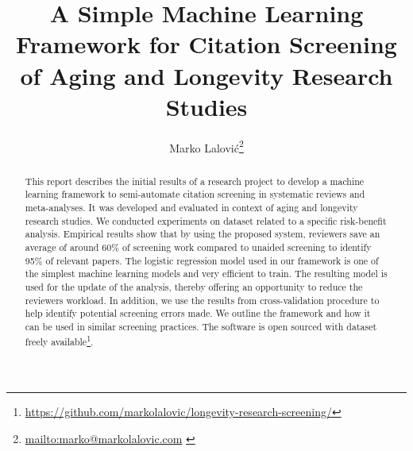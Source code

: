 \documentclass[10pt,twocolumn,letterpaper]{article}
\title{A Simple Machine Learning Framework for Citation Screening of Aging and Longevity Research Studies}
\author{%
	Marko Lalović\thanks{\footnotesize{%
	\url{mailto:marko@markolalovic.com}%
	}}
}
\renewcommand{\footnotesize}{\fontsize{7.5pt}{7.5pt}\selectfont}
\begin{document}
%
\saythanks

%

\begin{abstract}
{This report describes the initial results of a research project to develop a machine learning framework to semi-automate citation screening in systematic reviews and meta-analyses. It was developed and evaluated in context of aging and longevity research studies. We conducted experiments on dataset related to a specific risk-benefit analysis. Empirical results show that by using the proposed system, reviewers save an average of around 60\% of screening work compared to unaided screening to identify 95\% of relevant papers. The logistic regression model used in our framework is one of the simplest machine learning models and very efficient to train. The resulting model is used for the update of the analysis, thereby offering an opportunity to reduce the reviewers workload. In addition, we use the results from cross-validation procedure to help identify potential screening errors made. We outline the framework and how it can be used in similar screening practices. The software  is open sourced with dataset freely available{\footnote{\url{https://github.com/markolalovic/longevity-research-screening/}}}.
}
\end{abstract}
\end{document}
